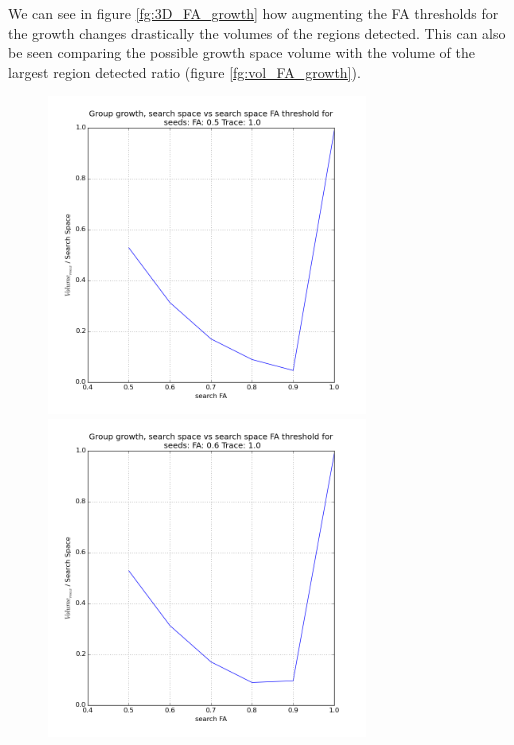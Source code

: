 \documentclass[12pt]{article}
\begin{document}
\begin{par}
 We can see in figure \ref{fg:3D_FA_growth} how augmenting the FA thresholds for the growth changes drastically the volumes of the regions detected. This can also be seen comparing the possible growth space volume with the volume of the largest region detected ratio (figure \ref{fg:vol_FA_growth}).
\end{par}

\begin{figure}[ht]
\centering
\begin{minipage}{.45\textwidth}
  \centering
  \includegraphics[width=0.75\textwidth]{groups/volumeplots/volumes_growth_FA05_Trace_10.png}
\end{minipage}
\begin{minipage}{.45\textwidth}
  \centering
  \includegraphics[width=0.75\textwidth]{groups/volumeplots/volumes_growth_FA06_Trace_10.png}

\end{minipage}
\end{figure}
\end{document}
